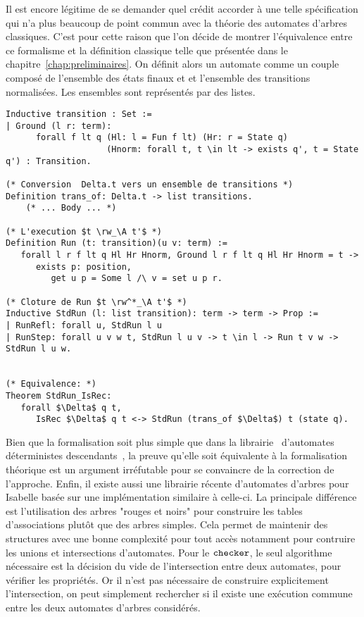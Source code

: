 Il est encore légitime de se demander quel crédit accorder à une telle spécification
qui n'a plus beaucoup de point commun avec la théorie des automates d'arbres classiques.
C'est pour cette raison que l'on décide de montrer l'équivalence entre ce formalisme 
et la définition classique telle que présentée dans le chapitre~\ref{chap:preliminaires}.
On définit alors un automate comme un couple composé de l'ensemble des états finaux et 
et l'ensemble des transitions normalisées. Les ensembles sont représentés par des listes.
\begin{lstlisting}
Inductive transition : Set :=
| Ground (l r: term):
      forall f lt q (Hl: l = Fun f lt) (Hr: r = State q)
                    (Hnorm: forall t, t \in lt -> exists q', t = State q') : Transition.

(* Conversion  Delta.t vers un ensemble de transitions *)
Definition trans_of: Delta.t -> list transitions.
    (* ... Body ... *)

(* L'execution $t \rw_\A t'$ *)
Definition Run (t: transition)(u v: term) := 
   forall l r f lt q Hl Hr Hnorm, Ground l r f lt q Hl Hr Hnorm = t ->
      exists p: position,
         get u p = Some l /\ v = set u p r.

(* Cloture de Run $t \rw^*_\A t'$ *)
Inductive StdRun (l: list transition): term -> term -> Prop :=
| RunRefl: forall u, StdRun l u
| RunStep: forall u v w t, StdRun l u v -> t \in l -> Run t v w -> StdRun l u w.


(* Equivalence: *)
Theorem StdRun_IsRec:
   forall $\Delta$ q t,
      IsRec $\Delta$ q t <-> StdRun (trans_of $\Delta$) t (state q).
\end{lstlisting}
Bien que la formalisation soit plus simple que dans la librairie \coq\ d'automates déterministes 
descendants~\cite{RivalGL-TPHOL01}, la preuve qu'elle soit équivalente à la formalisation théorique
est un argument irréfutable pour se convaincre de la correction de l'approche.
Enfin, il existe aussi une librairie récente d'automates d'arbres pour Isabelle\cite{TA-isabelle2010}
basée sur une implémentation similaire à celle-ci. La principale différence est l'utilisation des 
arbres "rouges et noirs" pour construire les tables d'associations plutôt que des arbres simples.
Cela permet de maintenir des structures avec une bonne complexité pour tout accès notamment pour
contruire les unions et intersections d'automates. Pour le $\mathtt{checker}$, le seul algorithme nécessaire
est la décision du vide de l'intersection entre deux automates, pour vérifier les propriétés. Or il n'est pas
nécessaire de construire explicitement l'intersection, on peut simplement rechercher si il existe une exécution commune 
entre les deux automates d'arbres considérés.


